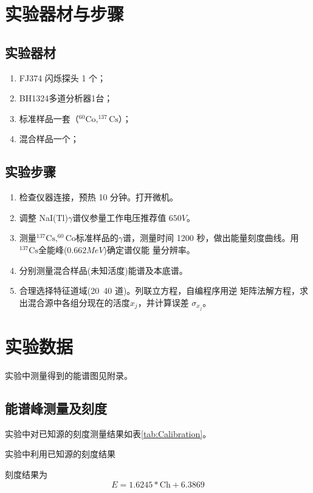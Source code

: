 \documentclass{article}
\begin{document}
    \section{实验器材与步骤}
    \subsection{实验器材}
    \begin{enumerate}
        \item FJ374 闪烁探头 1 个；
        \item BH1324多道分析器1台；
        \item 标准样品一套（$^{60}\text{Co},^{137}\text{Cs}$）；
        \item 混合样品一个；
    \end{enumerate}
    \subsection{实验步骤}
    \begin{enumerate}
        \item 检查仪器连接，预热 10 分钟。打开微机。
        \item 调整 NaI(Tl)$\gamma$谱仪参量工作电压推荐值 $650\si{V}$。
        \item 测量$^{137}\text{Cs}, ^{60}\text{Co}$标准样品的$\gamma$谱，测量时间 1200 秒，做出能量刻度曲线。用$^{137}\text{Cs}$全能峰($0.662\si{MeV}$)确定谱仪能 量分辨率。
        \item 分别测量混合样品(未知活度)能谱及本底谱。
        \item 合理选择特征道域(20~40 道)。列联立方程，自编程序用逆 矩阵法解方程，求出混合源中各组分现在的活度$x_j$，并计算误差
        $\sigma_{x_j}$。
    \end{enumerate}
    \section{实验数据}
    实验中测量得到的能谱图见附录。
    \subsection{能谱峰测量及刻度}
    实验中对已知源的刻度测量结果如表\ref{tab:Calibration}。
    \begin{table}[htbp]
        \centering
        \caption{实验中利用已知源的刻度结果\label{tab:Calibration}}
        
    \end{table}

    刻度结果为\begin{equation}
        E = 1.6245 * \text{Ch} + 6.3869
    \end{equation}
\end{document}
